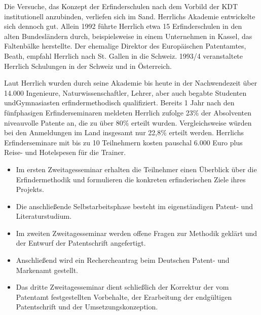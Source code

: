 \documentclass[11pt,a4paper]{article}
\begin{document}
Die Versuche, das Konzept der Erfinderschulen nach dem Vorbild der KDT
institutionell anzubinden, verliefen sich im Sand. Herrlichs Akademie
entwickelte sich dennoch gut. Allein 1992 führte Herrlich etwa 15
Erfinderschulen in den alten Bundesländern durch, beispielsweise in einem
Unternehmen in Kassel, das Faltenbälke herstellte. Der ehemalige Direktor des
Europäischen Patentamtes, Beath, empfahl Herrlich nach St. Gallen in die
Schweiz. 1993/4 veranstaltete Herrlich Schulungen in der Schweiz und in
Österreich.

Laut Herrlich wurden durch seine Akademie bis heute in der Nachwendezeit über
14.000 Ingenieure, Naturwissenschaftler, Lehrer, aber auch begabte Studenten
undGymnasiasten erfindermethodisch qualifiziert. Bereits 1 Jahr nach den
fünfphasigen Erfinderseminaren meldeten Herrlich zufolge 23\% der Absolventen
niveauvolle Patente an, die zu über 80\% erteilt wurden. Vergleichsweise
würden bei den Anmeldungen im Land insgesamt nur 22,8\% erteilt
werden. Herrlichs Erfinderseminare mit bis zu 10 Teilnehmern kosten pauschal
6.000 Euro plus Reise- und Hotelspesen für die Trainer.
\begin{itemize}
\item 
Im ersten Zweitagesseminar erhalten die Teilnehmer einen Überblick über die
Erfindermethodik und formulieren die konkreten erfinderischen Ziele ihres
Projekts.
\item 
Die anschließende Selbstarbeitsphase besteht im eigenständigen Patent- und
Literaturstudium.
\item 
Im zweiten Zweitagesseminar werden offene Fragen zur Methodik geklärt und der
Entwurf der Patentschrift angefertigt.
\item 
Anschließend wird ein Rechercheantrag beim Deutschen Patent- und Markenamt
gestellt.
\item 
Das dritte Zweitagesseminar dient schließlich der Korrektur der vom Patentamt
festgestellten Vorbehalte, der Erarbeitung der endgültigen Patentschrift und
der Umsetzungskonzeption.
\end{itemize}


\ccnotice
\end{document}

